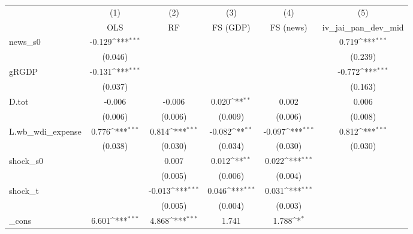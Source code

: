 {
\def\sym#1{\ifmmode^{#1}\else\(^{#1}\)\fi}
\begin{tabular}{l*{5}{c}}
\toprule
            &\multicolumn{1}{c}{(1)}&\multicolumn{1}{c}{(2)}&\multicolumn{1}{c}{(3)}&\multicolumn{1}{c}{(4)}&\multicolumn{1}{c}{(5)}\\
            &\multicolumn{1}{c}{OLS}&\multicolumn{1}{c}{RF}&\multicolumn{1}{c}{FS (GDP)}&\multicolumn{1}{c}{FS (news)}&\multicolumn{1}{c}{iv\_jai\_pan\_dev\_mid}\\
\midrule
news\_s0     &      -0.129\sym{***}&                     &                     &                     &       0.719\sym{***}\\
            &     (0.046)         &                     &                     &                     &     (0.239)         \\
\addlinespace
gRGDP       &      -0.131\sym{***}&                     &                     &                     &      -0.772\sym{***}\\
            &     (0.037)         &                     &                     &                     &     (0.163)         \\
\addlinespace
D.tot       &      -0.006         &      -0.006         &       0.020\sym{**} &       0.002         &       0.006         \\
            &     (0.006)         &     (0.006)         &     (0.009)         &     (0.006)         &     (0.008)         \\
\addlinespace
L.wb\_wdi\_expense&       0.776\sym{***}&       0.814\sym{***}&      -0.082\sym{**} &      -0.097\sym{***}&       0.812\sym{***}\\
            &     (0.038)         &     (0.030)         &     (0.034)         &     (0.030)         &     (0.030)         \\
\addlinespace
shock\_s0    &                     &       0.007         &       0.012\sym{**} &       0.022\sym{***}&                     \\
            &                     &     (0.005)         &     (0.006)         &     (0.004)         &                     \\
\addlinespace
shock\_t     &                     &      -0.013\sym{***}&       0.046\sym{***}&       0.031\sym{***}&                     \\
            &                     &     (0.005)         &     (0.004)         &     (0.003)         &                     \\
\addlinespace
\_cons      &       6.601\sym{***}&       4.868\sym{***}&       1.741         &       1.788\sym{*}  &                     \\

\end{tabular}}
